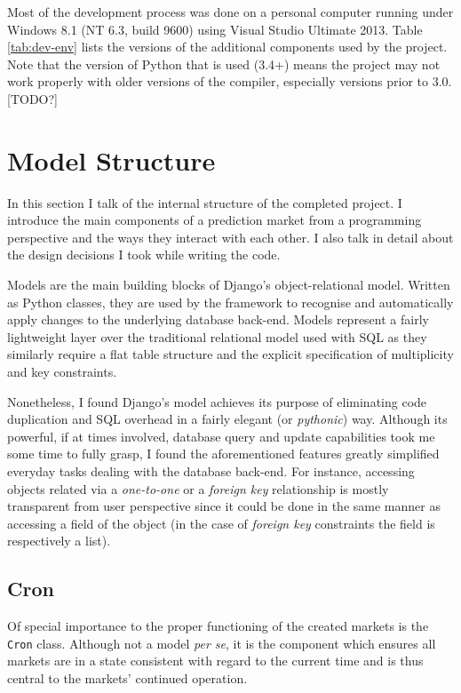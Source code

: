 \documentclass[bsc,frontabs,twoside,singlespacing,parskip,deptreport]{infthesis}     %
\begin{document}
	Most of the development process was done on a personal computer running under Windows 8.1 (NT 6.3, build 9600) using Visual Studio Ultimate 2013. Table \ref{tab:dev-env} lists the versions of the additional components used by the project. Note that the version of Python that is used (3.4+) means the project may not work properly with older versions of the compiler, especially versions prior to $3.0$. [TODO?]


\section{Model Structure}

In this section I talk of the internal structure of the completed project. I introduce the main components of a prediction market from a programming perspective and the ways they interact with each other. I also talk in detail about the design decisions I took while writing the code.

    Models are the main building blocks of Django's object-relational model. Written as Python classes, they are used by the framework to recognise and automatically apply changes to the underlying database back-end. Models represent a fairly lightweight layer over the traditional relational model used with SQL as they similarly require a flat table structure and the explicit specification of multiplicity and key constraints. 

	Nonetheless, I found Django's model achieves its purpose of eliminating code duplication and SQL overhead in a fairly elegant (or {\em pythonic}) way. Although its powerful, if at times involved, database query and update capabilities took me some time to fully grasp, I found the aforementioned features greatly simplified everyday tasks dealing with the database back-end. For instance, accessing objects related via a {\it one-to-one} or a {\it foreign key} relationship is mostly transparent from user perspective since it could be done in the same manner as accessing a field of the object (in the case of {\it foreign key} constraints the field is respectively a list). 

\subsection{Cron}

	Of special importance to the proper functioning of the created markets is the {\tt Cron} class. Although not a model {\it per se}, it is the component which ensures all markets are in a state consistent with regard to the current time and is thus central to the markets' continued operation. 
\end{document}
